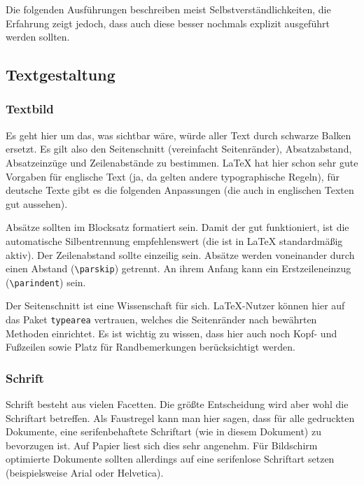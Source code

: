 \documentclass[a4paper, 11pt]{article}
\begin{document}
Die folgenden Ausführungen beschreiben meist Selbstverständlichkeiten, die Erfahrung zeigt jedoch, dass auch diese besser nochmals explizit ausgeführt werden sollten.

\subsection{Textgestaltung}

\subsubsection{Textbild}

Es geht hier um das, was sichtbar wäre, würde aller Text durch schwarze Balken ersetzt. Es gilt also den Seitenschnitt (vereinfacht Seitenränder), Absatzabstand, Absatzeinzüge und Zeilenabstände zu bestimmen. \LaTeX{} hat hier schon sehr gute Vorgaben für englische Text (ja, da gelten andere typographische Regeln), für deutsche Texte gibt es die folgenden Anpassungen (die auch in englischen Texten gut aussehen).

Absätze sollten im Blocksatz formatiert sein. Damit der gut funktioniert, ist die automatische Silbentrennung empfehlenswert (die ist in \LaTeX{} standardmäßig aktiv). Der Zeilenabstand sollte einzeilig sein. Absätze werden voneinander durch einen Abstand (\texttt{\textbackslash parskip}) getrennt. An ihrem Anfang kann ein Erstzeileneinzug (\texttt{\textbackslash parindent}) sein.

Der Seitenschnitt ist eine Wissenschaft für sich. \LaTeX-Nutzer können hier auf das Paket \texttt{typearea} vertrauen, welches die Seitenränder nach bewährten Methoden einrichtet. Es ist wichtig zu wissen, dass hier auch noch Kopf- und Fußzeilen sowie Platz für Randbemerkungen berücksichtigt werden.

\subsubsection{Schrift}

Schrift besteht aus vielen Facetten. Die größte Entscheidung wird aber wohl die Schriftart betreffen. Als Faustregel kann man hier sagen, dass für alle gedruckten Dokumente, eine serifenbehaftete Schriftart (wie in diesem Dokument) zu bevorzugen ist. Auf Papier liest sich dies sehr angenehm. Für Bildschirm optimierte Dokumente sollten allerdings auf eine serifenlose Schriftart setzen (beispielsweise Arial oder Helvetica).
\end{document}
